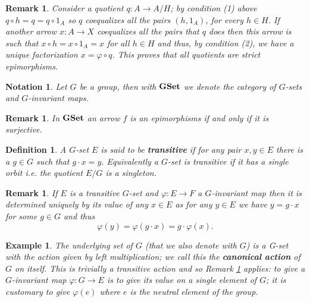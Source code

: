 \documentclass[italian, 12pt, reqno]{article}
\theoremstyle{myteo}
\newtheorem{definition}[theorem]{Definition}
\newtheorem{example}[theorem]{Example}
\newtheorem{remark}[theorem]{Remark}
\newtheorem{notation}[theorem]{Notation}
\numberwithin{equation}{section}
\newcommand{\gset}{\text{\textbf{GSet}}}
\newcommand{\fun}[3]{#1\colon#2\to #3}
\begin{document}
\begin{remark}
  \label{rem:quotient_are_strict_epi}
  Consider a quotient \(\fun{q}{A}{A/H}\); by condition (1) above \(q\circ h = q = q\circ 1_A\) so \(q\) coequalizes all the pairs \((h, 1_A)\), for every \(h\in H\).
  If another arrow \(\fun{x}{A}{X}\) coequalizes all the pairs that \(q\) does then this arrow is such that \(x\circ h = x\circ 1_A = x\) for all \(h\in H\) and thus, by condition (2), we have a unique factorization \(x = \varphi\circ q\).
  This proves that all quotients are strict epimorphisms.
\end{remark}

\begin{notation}
  Let \(G\) be a group, then with \(\gset\) we denote the category of \(G\)-sets and \(G\)-invariant maps.
\end{notation}

\begin{remark}
  \label{rem:gset_epi}
  In \(\gset\) an arrow \(f\) is an epimorphisms if and only if it is surjective.
\end{remark}

\begin{definition}
  \label{def:transitive_action}
  A \(G\)-set \(E\) is said to be \textbf{transitive} if for any pair \(x, y \in E\) there is a \(g \in G\) such that \(g \cdot x = y\).
  Equivalently a \(G\)-set is transitive if it has a single orbit i.e. the quotient \(E/G\) is a singleton.
\end{definition}

\begin{remark}
  \label{rem:maps_out_of_transitive_sets}
  If \(E\) is a transitive \(G\)-set and \(\varphi: E \to F\) a \(G\)-invariant map then it is determined uniquely by its value of any \(x \in E\) as for any \(y \in E\) we have \(y = g \cdot x\) for some \(g \in G\) and thus
  \begin{equation*}
    \varphi(y) = \varphi(g \cdot x) = g \cdot \varphi(x).
  \end{equation*}
\end{remark}

\begin{example}
  \label{ex:canonical_action}
  The underlying set of \(G\) (that we also denote with \(G\)) is a G-set with the action given by left multiplication; we call this the \textbf{canonical action} of \(G\) on itself.
  This is trivially a transitive action and so Remark \ref{rem:maps_out_of_transitive_sets} applies: to give a \(G\)-invariant map \(\varphi: G \to E\) is to give its value on a single element of \(G\); it is customary to give \(\varphi(e)\) where \(e\) is the neutral element of the group.
\end{example}
\end{document}
